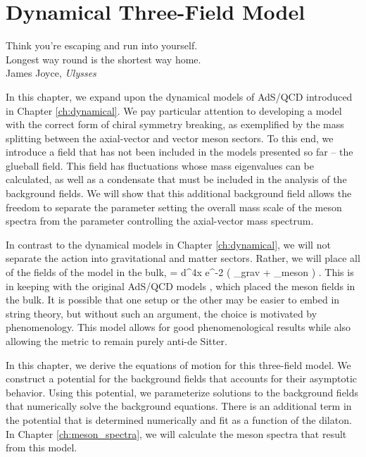 \chapter{Dynamical Three-Field Model}
\label{ch:dynamical_threefield}

\begin{flushright}
Think you're escaping and run into yourself. \\Longest way round is the shortest way home. \\
James Joyce, \emph{Ulysses}
\end{flushright}

In this chapter, we expand upon the dynamical models of AdS/QCD introduced in Chapter \ref{ch:dynamical}.
We pay particular attention to developing a model with the correct form of chiral symmetry breaking, as exemplified by the mass splitting between the axial-vector and vector meson sectors.
To this end, we introduce a field that has not been included in the models presented so far -- the glueball field. 
This field has fluctuations whose mass eigenvalues can be calculated, as well as a condensate that must be included in the analysis of the background fields. 
We will show that this additional background field allows the freedom to separate the parameter setting the overall mass scale of the meson spectra from the parameter controlling the axial-vector mass spectrum.

In contrast to the dynamical models in Chapter \ref{ch:dynamical}, we will not separate the action into gravitational and matter sectors. 
Rather, we will place all of the fields of the model in the bulk,
\be
\cS = \int d^4x e^{-2\Phi} \left( \cL_{grav} + \cL_{meson} \right) .
\ee
This is in keeping with the original AdS/QCD models \cite{stephanov-katz-son,karch-katz-son-adsqcd}, which placed the meson fields in the bulk.
It is possible that one setup or the other may be easier to embed in string theory, but without such an argument, the choice is motivated by phenomenology. 
This model allows for good phenomenological results while also allowing the metric to remain purely anti-de Sitter.

In this chapter, we derive the equations of motion for this three-field model.
We construct a potential for the background fields that accounts for their asymptotic behavior. 
Using this potential, we parameterize solutions to the background fields that numerically solve the background equations.
There is an additional term in the potential that is determined numerically and fit as a function of the dilaton.
In Chapter \ref{ch:meson_spectra}, we will calculate the meson spectra that result from this model.

